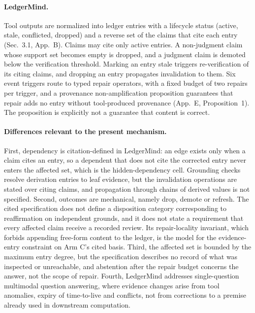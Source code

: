 \documentclass[11pt]{article}
\begin{document}
\paragraph{LedgerMind.} Tool outputs are normalized into ledger entries with a lifecycle status (active, stale, conflicted, dropped) and a reverse set of the claims that cite each entry (Sec.~3.1, App.~B). Claims may cite only active entries. A non-judgment claim whose support set becomes empty is dropped, and a judgment claim is demoted below the verification threshold. Marking an entry stale triggers re-verification of its citing claims, and dropping an entry propagates invalidation to them. Six event triggers route to typed repair operators, with a fixed budget of two repairs per trigger, and a provenance non-amplification proposition guarantees that repair adds no entry without tool-produced provenance (App.~E, Proposition~1). The proposition is explicitly not a guarantee that content is correct.

\paragraph{Differences relevant to the present mechanism.} First, dependency is citation-defined in LedgerMind: an edge exists only when a claim cites an entry, so a dependent that does not cite the corrected entry never enters the affected set, which is the hidden-dependency cell. Grounding checks resolve derivation entries to leaf evidence, but the invalidation operations are stated over citing claims, and propagation through chains of derived values is not specified. Second, outcomes are mechanical, namely drop, demote or refresh. The cited specification does not define a disposition category corresponding to reaffirmation on independent grounds, and it does not state a requirement that every affected claim receive a recorded review. Its repair-locality invariant, which forbids appending free-form content to the ledger, is the model for the evidence-entry constraint on Arm C's cited basis. Third, the affected set is bounded by the maximum entry degree, but the specification describes no record of what was inspected or unreachable, and abstention after the repair budget concerns the answer, not the scope of repair. Fourth, LedgerMind addresses single-question multimodal question answering, where evidence changes arise from tool anomalies, expiry of time-to-live and conflicts, not from corrections to a premise already used in downstream computation.
\end{document}
